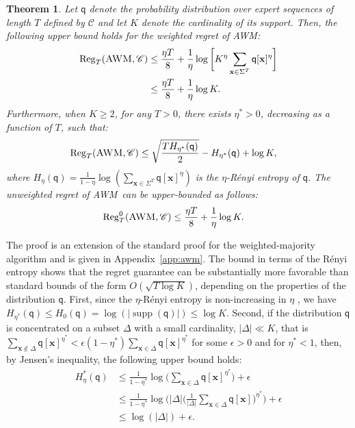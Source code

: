 \documentclass{article}
\DeclareMathOperator*{\supp}{supp}
\newcommand{\sC}{\mathscr C}
\newcommand{\bx}{{\mathbf x}}
\newcommand{\sfq}{{\mathsf q}}
\newcommand{\Reg}{\mathrm{Reg}}
\newcommand{\e}{\epsilon}
\newcommand{\ignore}[1]{}
\newcommand{\AWM}{\textsc{AWM}}
\newtheorem{theorem}{Theorem}
\begin{document}
\begin{theorem}
\label{th:awm}
Let $\sfq$ denote the probability distribution over expert sequences
of length $T$ defined by $\sC$ and let $K$ denote the cardinality of
its support. Then, the following upper bound holds for the weighted
regret of \AWM:
\begin{align*}
  \Reg_T(\AWM, \sC) 
  & \leq \frac{\eta T}{8} + \frac{1}{\eta} \log \bigg[ K^\eta \sum_{\bx
    \in \Sigma^T} \sfq[\bx]^\eta \bigg] \\
    &\leq \frac{\eta T}{8} + \frac{1}{\eta} \log K. 
\end{align*}
Furthermore, when $K \geq 2$, for any $T > 0$, there exists
$\eta^* > 0$, decreasing as a function of $T$, such that:
\begin{align*}
    \Reg_T(\AWM, \sC) 
    & \leq \sqrt{\frac{T H_{\eta^*}(\sfq)}{2}} - H_{\eta^*}(\sfq) + \log
    K,
\end{align*}
where
$H_\eta(\sfq) = \frac{1}{1 - \eta} \log\left(\sum_{\bx \in \Sigma^T}
  \sfq[\bx]^\eta \right)$ is the $\eta$-R\'{e}nyi entropy of $\sfq$.  The
unweighted regret of \AWM\ can be upper-bounded as follows:
\begin{align*}
  \Reg_T^0(\AWM, \sC) 
  & \leq \frac{\eta T}{8} + \frac{1}{\eta} \log K.
\end{align*}

\end{theorem}

The proof is an extension of the standard proof for the
weighted-majority algorithm and is given in Appendix~\ref{app:awm}.
The bound in terms of the R\'enyi entropy shows that the regret
guarantee can be substantially more favorable than standard bounds of
the form $O(\sqrt{T \log K})$, depending on the properties of the
distribution $\sfq$. First, since the $\eta$-R\'enyi entropy is
non-increasing in $\eta$ \citep{VanErvenHarremos2014}, we have
$H_{\eta^*}(\sfq) \leq H_0(\sfq) = \log(|\supp(\sfq)|) \leq \log
K$. Second, if the distribution $\sfq$ is concentrated on a subset
$\Delta$ with a small cardinality, $|\Delta| \ll K$, that is
$\sum_{\bx \not \in \Delta} \sfq[\bx]^{\eta^*} < \e (1-\eta^*)
\sum_{\bx \in \Delta} \sfq[\bx]^{\eta^*}$ for some $\e > 0$ and for
$\eta^* < 1$, then, by Jensen's inequality, the following upper bound
holds:
\begin{align*}
  H_\eta^*(\sfq)
\ignore{
  & \leq \frac{1}{1 - \eta^*} \log \bigg( \sum_{\bx \in \Delta}
    \sfq[\bx]^{\eta^*\!} + \e (1 - \eta^*) \sum_{\bx \in \Delta}
  \sfq[\bx] \bigg) \\
}
  & \leq \frac{1}{1 - \eta^*} \log \bigg(\sum_{\bx \in \Delta}
    \sfq[\bx]^{\eta^*\!}\bigg) + \e \\ 
    &\leq \frac{1}{1 - \eta^*} \log \bigg(|\Delta| \bigg(\frac{1}{|\Delta|}\sum_{\bx \in \Delta}
    \sfq[\bx]\bigg)^{\eta^*\!}\bigg) + \e \\ 
    &\leq \log(|\Delta|) + \e. 
\end{align*}
\end{document}
